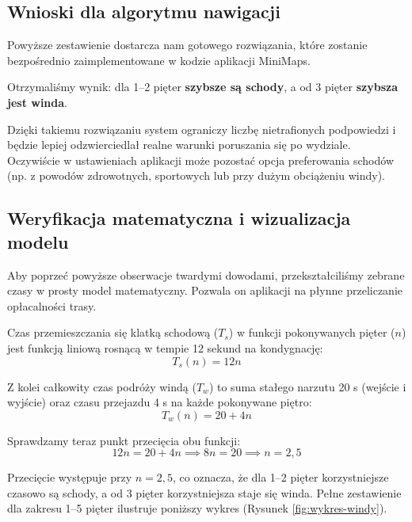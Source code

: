 \documentclass[14pt,a4paper]{extarticle}
\begin{document}
\subsection{Wnioski dla algorytmu nawigacji}
Powyższe zestawienie dostarcza nam gotowego rozwiązania, które zostanie bezpośrednio zaimplementowane w kodzie aplikacji MiniMaps.

Otrzymaliśmy wynik: dla 1--2 pięter \textbf{szybsze są schody}, a od 3 pięter \textbf{szybsza jest winda}.

Dzięki takiemu rozwiązaniu system ograniczy liczbę nietrafionych podpowiedzi i będzie lepiej odzwierciedlał realne warunki poruszania się po wydziale. Oczywiście w ustawieniach aplikacji może pozostać opcja preferowania schodów (np. z powodów zdrowotnych, sportowych lub przy dużym obciążeniu windy).

\subsection{Weryfikacja matematyczna i wizualizacja modelu}

Aby poprzeć powyższe obserwacje twardymi dowodami, przekształciliśmy zebrane czasy w prosty model matematyczny. Pozwala on aplikacji na płynne przeliczanie opłacalności trasy.

Czas przemieszczania się klatką schodową ($T_s$) w funkcji pokonywanych pięter ($n$) jest funkcją liniową rosnącą w tempie 12 sekund na kondygnację:
\begin{equation}
    T_s(n) = 12n
\end{equation}

Z kolei całkowity czas podróży windą ($T_w$) to suma stałego narzutu 20 s (wejście i wyjście) oraz czasu przejazdu 4 s na każde pokonywane piętro:
\begin{equation}
    T_w(n) = 20 + 4n
\end{equation}

Sprawdzamy teraz punkt przecięcia obu funkcji:
\begin{equation}
    12n = 20 + 4n \implies 8n = 20 \implies n = 2{,}5
\end{equation}

Przecięcie występuje przy $n=2{,}5$, co oznacza, że dla 1--2 pięter korzystniejsze czasowo są schody, a od 3 pięter korzystniejsza staje się winda. Pełne zestawienie dla zakresu 1--5 pięter ilustruje poniższy wykres (Rysunek \ref{fig:wykres-windy}).
\end{document}
